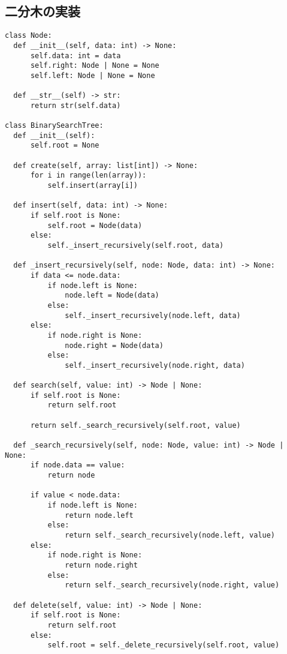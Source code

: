 \subsection{二分木の実装}
\begin{lstlisting}[caption=二分木の実装, frame=TRBL, label={binary_tree}]
class Node:
  def __init__(self, data: int) -> None:
      self.data: int = data
      self.right: Node | None = None
      self.left: Node | None = None
      
  def __str__(self) -> str:
      return str(self.data)
  
class BinarySearchTree:
  def __init__(self):
      self.root = None
      
  def create(self, array: list[int]) -> None:
      for i in range(len(array)):
          self.insert(array[i])
  
  def insert(self, data: int) -> None:
      if self.root is None:
          self.root = Node(data)
      else:
          self._insert_recursively(self.root, data)
  
  def _insert_recursively(self, node: Node, data: int) -> None:
      if data <= node.data:
          if node.left is None:
              node.left = Node(data)
          else:
              self._insert_recursively(node.left, data)
      else:
          if node.right is None:
              node.right = Node(data)
          else:
              self._insert_recursively(node.right, data)
  
  def search(self, value: int) -> Node | None:
      if self.root is None:
          return self.root
      
      return self._search_recursively(self.root, value)
      
  def _search_recursively(self, node: Node, value: int) -> Node | None:
      if node.data == value:
          return node
      
      if value < node.data:
          if node.left is None:
              return node.left
          else:
              return self._search_recursively(node.left, value)
      else:
          if node.right is None:
              return node.right
          else:
              return self._search_recursively(node.right, value)
  
  def delete(self, value: int) -> Node | None:
      if self.root is None:
          return self.root
      else:
          self.root = self._delete_recursively(self.root, value)
  

\end{lstlisting}
